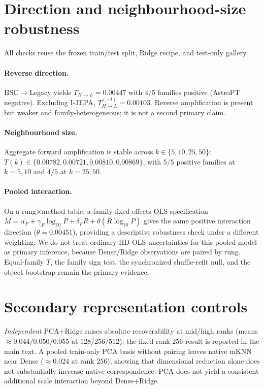 \documentclass{article}
\begin{document}
\section{Direction and neighbourhood-size robustness}\label{app:dirk}

All checks reuse the frozen train/test split, Ridge recipe, and test-only gallery.

\paragraph{Reverse direction.}
HSC\(\to\)Legacy yields \(T_{H\to L}{=}0.00447\) with \(4/5\) families positive (AstroPT negative).
Excluding I-JEPA, \(T_{H\to L}^{(-I)}{=}0.00103\).
Reverse amplification is present but weaker and family-heterogeneous; it is not a second primary claim.

\paragraph{Neighbourhood size.}
Aggregate forward amplification is stable across \(k\in\{5,10,25,50\}\):
\(T(k)\in\{0.00782,0.00721,0.00810,0.00869\}\),
with \(5/5\) positive families at \(k{=}5,10\) and \(4/5\) at \(k{=}25,50\).

\paragraph{Pooled interaction.}
On a rung\(\times\)method table, a family-fixed-effects OLS specification
\(M=\alpha_F+\gamma_F\log_{10}P+\delta_F R+\theta(R\log_{10}P)\)
gives the same positive interaction direction (\(\theta{=}0.00451\)), providing a descriptive robustness check under a different weighting.
We do not treat ordinary IID OLS uncertainties for this pooled model as primary inference, because Dense/Ridge observations are paired by rung.
Equal-family \(T\), the family sign test, the synchronized shuffle-refit null, and the object bootstrap remain the primary evidence.

\section{Secondary representation controls}\label{app:pca}\label{app:fixedrank}\label{app:sparse}\label{app:residual}

\emph{Independent} PCA+Ridge raises absolute recoverability at mid/high ranks (means \(\approx0.044/0.050/0.055\) at \(128/256/512\)); the fixed-rank \(256\) result is reported in the main text.
A pooled train-only PCA basis without pairing leaves native mKNN near Dense (\(\approx0.024\) at rank \(256\)), showing that dimensional reduction alone does not substantially increase native correspondence.
PCA does not yield a consistent additional scale interaction beyond Dense+Ridge.
\end{document}

